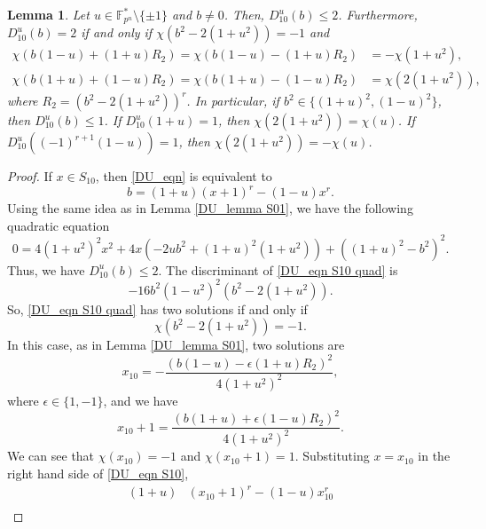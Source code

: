 \documentclass[10pt,a4paper]{amsart}
\newtheorem{lemma}{Lemma}
\newcommand{\Fpnmul}{\mathbb{F}_{p^n}^*}
\begin{document}
\begin{lemma}\label{DU_lemma S10}
	Let $u\in \Fpnmul \setminus \{\pm1\}$ and $b\ne 0$. Then, $D_{10}^u(b)\le 2$. Furthermore, $D_{10}^u(b) = 2$ if and only if $\chi(b^2-2(1+u^2))=-1$ and 
	\begin{align*}
		\chi(b(1-u)+(1+u)R_2) = \chi(b(1-u)-(1+u)R_2) &= -\chi(1+u^2),\\
		\chi(b(1+u)+(1-u)R_2) = \chi(b(1+u)-(1-u)R_2) &= \chi(2(1+u^2)),
	\end{align*}
	where $R_2  = (b^2-2(1+u^2))^r $. In particular, if $b^2\in \{(1+u)^2, (1-u)^2\}$, then $D_{10}^u(b)\le 1$. If $D_{10}^u(1+u)= 1$, then $\chi(2(1+u^2))=\chi(u)$. If $D_{10}^u((-1)^{r+1}(1-u))= 1$, then $\chi(2(1+u^2))=-\chi(u)$. 
\end{lemma}

\begin{proof}
If $x\in S_{10}$, then \eqref{DU_eqn} is equivalent to 
\begin{equation}\label{DU_eqn S10}
	b=(1+ u)(x+1)^r- (1-u)x^r .  
\end{equation}
Using the same idea as in Lemma \ref{DU_lemma S01}, we have the following quadratic equation
\begin{equation}\label{DU_eqn S10 quad}
	0=4(1+u^2)^2x^2+4x\left( -2ub^2 +(1+u)^2(1+u^2) \right) +\left(  (1+u)^2 -b^2\right)^2. 
\end{equation}
Thus, we have $D_{10}^u(b) \le 2$. The discriminant of \eqref{DU_eqn S10 quad} is 
\begin{equation*}
	-16b^2(1-u^2)^2\left( b^2-2(1+u^2) \right). 
\end{equation*}
So, \eqref{DU_eqn S10 quad} has two solutions if and only if 
\begin{equation*}
	\chi\left( b^2-2(1+u^2) \right)=-1.
\end{equation*}
In this case, as in Lemma \ref{DU_lemma S01}, two solutions are
\begin{equation*}
	x_{10}= -\frac{\left( b(1-u)-\epsilon (1+u)R_2\right)^2}{4(1+u^2)^2},
\end{equation*}
where $\epsilon\in \{1,-1\}$, and we have
\begin{equation*}
	x_{10}+1 =\frac{\left( b(1+u)+\epsilon(1-u)R_2\right) ^2}{4(1+u^2)^2}.
\end{equation*}
We can see that $\chi(x_{10})=-1$ and $\chi(x_{10}+1)=1$. Substituting $x=x_{10}$ in the right hand side of \eqref{DU_eqn S10},
\begin{align*}
	(1+ u)&(x_{10}+1)^r- (1-u)x_{10}^r \\

\end{align*}
\end{proof}
\end{document}
